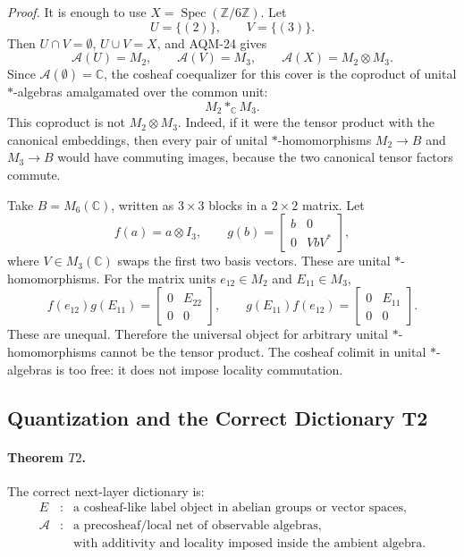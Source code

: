 \emph{Proof.}
It is enough to use \(X=\operatorname{Spec}(\mathbb Z/6\mathbb Z)\).  Let
\[
  U=\{(2)\},\qquad V=\{(3)\}.
\]
Then \(U\cap V=\emptyset\), \(U\cup V=X\), and AQM-24 gives
\[
  \mathcal A(U)=M_2,\qquad
  \mathcal A(V)=M_3,\qquad
  \mathcal A(X)=M_2\otimes M_3.
\]
Since \(\mathcal A(\emptyset)=\mathbb C\), the cosheaf coequalizer for this
cover is the coproduct of unital \(*\)-algebras amalgamated over the common
unit:
\[
  M_2 *_\mathbb C M_3.
\]
This coproduct is not \(M_2\otimes M_3\).  Indeed, if it were the tensor
product with the canonical embeddings, then every pair of unital
\(*\)-homomorphisms \(M_2\to B\) and \(M_3\to B\) would have commuting images,
because the two canonical tensor factors commute.

Take \(B=M_6(\mathbb C)\), written as \(3\times3\) blocks in a \(2\times2\)
matrix.  Let
\[
  f(a)=a\otimes I_3,
  \qquad
  g(b)=
  \begin{bmatrix}
    b&0\\
    0&VbV^*
  \end{bmatrix},
\]
where \(V\in M_3(\mathbb C)\) swaps the first two basis vectors.  These are
unital \(*\)-homomorphisms.  For the matrix units \(e_{12}\in M_2\) and
\(E_{11}\in M_3\),
\[
  f(e_{12})g(E_{11})
  =
  \begin{bmatrix}0&E_{22}\\0&0\end{bmatrix},
  \qquad
  g(E_{11})f(e_{12})
  =
  \begin{bmatrix}0&E_{11}\\0&0\end{bmatrix}.
\]
These are unequal.  Therefore the universal object for arbitrary unital
\(*\)-homomorphisms cannot be the tensor product.  The cosheaf colimit in
unital \(*\)-algebras is too free: it does not impose locality commutation.

\subsection{Quantization and the Correct Dictionary T2}

\paragraph{Theorem \(T2\).}
The correct next-layer dictionary is:
\[
\begin{array}{rcl}
E&:&\text{a cosheaf-like label object in abelian groups or vector spaces},\\
\mathcal A&:&\text{a precosheaf/local net of observable algebras},\\
&&\text{with additivity and locality imposed inside the ambient algebra.}
\end{array}
\]

